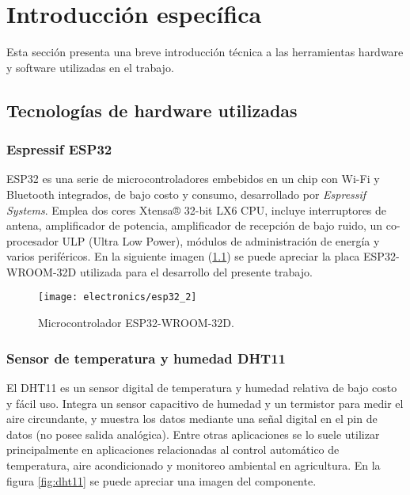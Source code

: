 

\chapter{Introducción específica} %

\label{Chapter2}

Esta sección presenta una breve introducción técnica a las herramientas hardware y software utilizadas en el trabajo.

\section{Tecnologías de hardware utilizadas}

\subsection{Espressif ESP32}


ESP32 \cite{ESP32} es una serie de microcontroladores embebidos en un chip con Wi-Fi y Bluetooth integrados, de bajo costo y consumo, desarrollado por \textit{Espressif Systems}. Emplea dos cores Xtensa® 32-bit LX6 CPU, incluye interruptores de antena, amplificador de potencia, amplificador de recepción de bajo ruido, un co-procesador ULP (Ultra Low Power), módulos de administración de energía y varios periféricos.
En la siguiente imagen (\ref{fig:esp32}) se puede apreciar la placa ESP32-WROOM-32D \cite{ESP32_wroom_32d_datasheet} utilizada para el desarrollo del presente trabajo.

\begin{figure}[h]
    \centering
    \texttt{[image: electronics/esp32\_2]}
    \caption{Microcontrolador ESP32-WROOM-32D.}
    \label{fig:esp32}
\end{figure}


\subsection{Sensor de temperatura y humedad DHT11}

El DHT11 \cite{DHT11_datasheet} es un sensor digital de temperatura y humedad relativa de bajo costo y fácil uso. Integra un sensor capacitivo de humedad y un termistor para medir el aire circundante, y muestra los datos mediante una señal digital en el pin de datos (no posee salida analógica). Entre otras aplicaciones se lo suele utilizar principalmente en aplicaciones relacionadas al control automático de temperatura, aire acondicionado y monitoreo ambiental en agricultura. En la figura \ref{fig:dht11} se puede apreciar una imagen del componente.

